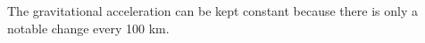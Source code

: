 The gravitational acceleration can be kept constant because there is only a notable change every 100 km.